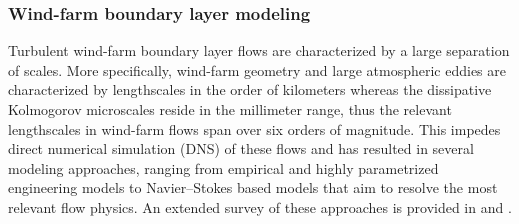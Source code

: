 
\subsubsection{Wind-farm boundary layer modeling}
Turbulent wind-farm boundary layer flows are characterized by a large separation of scales. More specifically, wind-farm geometry and large atmospheric eddies are characterized by lengthscales in the order of kilometers whereas the dissipative Kolmogorov microscales reside in the millimeter range, thus the relevant lengthscales in wind-farm flows span over six orders of magnitude. This impedes direct numerical simulation (DNS) of these flows and has resulted in several modeling approaches, ranging from empirical and highly parametrized engineering models to Navier--Stokes based models that aim to resolve the most relevant flow physics. An extended survey of these approaches is provided in \cite{crespo1999survey} and \cite{sanderse2011review}. 

